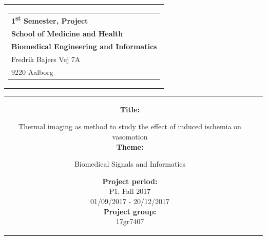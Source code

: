 % 
\thispagestyle{empty}
\begin{titlepage}
\begin{nopagebreak}
{\samepage 

\begin{tabular}{r}
\parbox{\textwidth}{  
\hfill \hspace{2cm} \parbox{8cm}{\begin{tabular}{l} %
{\small \textbf{\textcolor{aaublue}{{1\textsuperscript{st} Semester, Project}}}}\\
{\small \textbf{\textcolor{aaublue}{School of Medicine and Health}}}\\
{\small \textbf{\textcolor{aaublue}{Biomedical Engineering and Informatics}}}\\
{\small \textcolor{aaublue}{Fredrik Bajers Vej 7A}} \\
{\small \textcolor{aaublue}{9220 Aalborg}} \\
\end{tabular}}}
\end{tabular}

\begin{tabular}{cc}
\parbox{7cm}{

\textbf{Title:}

Thermal imaging as method to study the effect of induced ischemia on vasomotion \\ 

\textbf{Theme:}

\small{
 Biomedical Signals and Informatics\\
}


\parbox{8cm}{


\textbf{Project period:}\\
P1, Fall 2017\\
01/09/2017 - 20/12/2017\\
   
\textbf{Project group:}\\
17gr7407\\ %
  
}}
\end{tabular}}
\end{nopagebreak}
\end{titlepage}
